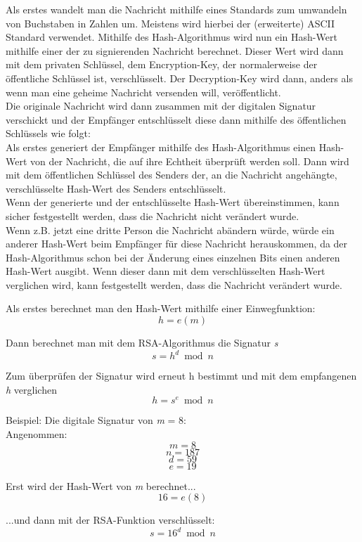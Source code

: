\documentclass[14pt,a4paper]{scrartcl}
\begin{document}
Als erstes wandelt man die Nachricht mithilfe eines Standards zum umwandeln von Buchstaben in Zahlen um. Meistens wird hierbei der (erweiterte) ASCII Standard verwendet. %
Mithilfe des Hash-Algorithmus wird nun ein Hash-Wert mithilfe einer  der zu signierenden Nachricht berechnet. Dieser Wert wird dann mit dem privaten Schlüssel, dem Encryption-Key, der normalerweise der öffentliche Schlüssel ist, verschlüsselt. %
	Der Decryption-Key wird dann, anders als wenn man eine geheime Nachricht versenden will, veröffentlicht.\\
	Die originale Nachricht wird dann zusammen mit der digitalen Signatur verschickt und der Empfänger entschlüsselt diese dann mithilfe des öffentlichen Schlüssels wie folgt:\\
	Als erstes generiert der Empfänger mithilfe des Hash-Algorithmus einen Hash-Wert von der Nachricht, die auf ihre Echtheit überprüft werden soll. Dann wird mit dem öffentlichen Schlüssel des Senders der, an die Nachricht angehängte, verschlüsselte Hash-Wert des Senders entschlüsselt. \\
Wenn der generierte und der entschlüsselte Hash-Wert übereinstimmen, kann sicher festgestellt werden, dass die Nachricht nicht verändert wurde. \\
Wenn z.B. jetzt eine dritte Person die Nachricht abändern würde, würde ein anderer Hash-Wert beim Empfänger für diese Nachricht herauskommen, da der Hash-Algorithmus schon bei der Änderung eines einzelnen Bits einen anderen Hash-Wert ausgibt. Wenn dieser dann mit dem verschlüsselten Hash-Wert verglichen wird, kann festgestellt werden, dass die Nachricht verändert wurde.

Als erstes berechnet man den Hash-Wert mithilfe einer Einwegfunktion:
$$ {h = e(m)} $$

Dann berechnet man mit dem RSA-Algorithmus die Signatur \textit{s}
$$ {s = h^d \bmod n} $$

Zum überprüfen der Signatur wird erneut h bestimmt und mit dem empfangenen \textit{h} verglichen
$$ {h = s^e \bmod n} $$

Beispiel: Die digitale Signatur von \textit{m} = 8:\\ 

Angenommen:
$${ \textit{m} = 8 }$$
$${ \textit{n} = 187 }$$
$${ \textit{d} = 59 }$$
$${ \textit{e} = 19 }$$


Erst wird der Hash-Wert von \textit{m} berechnet...
$$ {16 = e(8)} $$	

...und dann mit der RSA-Funktion verschlüsselt: %
$$ {s = 16^d \bmod n} $$	
\end{document}

